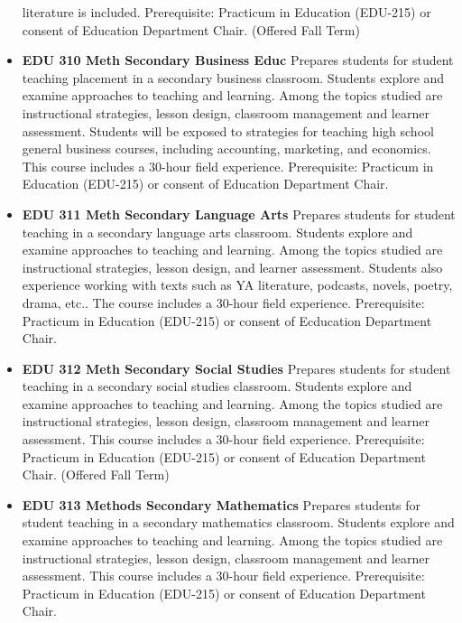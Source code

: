 \documentclass[
  letterpaper,
]{scrbook}
\begin{document}
\begin{itemize}
  literature is included. Prerequisite: Practicum in Education (EDU-215)
  or consent of Education Department Chair. (Offered Fall Term)\\
\item
  \textbf{EDU 310 Meth Secondary Business Educ} Prepares students for
  student teaching placement in a secondary business classroom. Students
  explore and examine approaches to teaching and learning. Among the
  topics studied are instructional strategies, lesson design, classroom
  management and learner assessment. Students will be exposed to
  strategies for teaching high school general business courses,
  including accounting, marketing, and economics. This course includes a
  30-hour field experience. Prerequisite: Practicum in Education
  (EDU-215) or consent of Education Department Chair.\\
\item
  \textbf{EDU 311 Meth Secondary Language Arts} Prepares students for
  student teaching in a secondary language arts classroom. Students
  explore and examine approaches to teaching and learning. Among the
  topics studied are instructional strategies, lesson design, and
  learner assessment. Students also experience working with texts such
  as YA literature, podcasts, novels, poetry, drama, etc.. The course
  includes a 30-hour field experience. Prerequisite: Practicum in
  Education (EDU-215) or consent of Ecducation Department Chair.\\
\item
  \textbf{EDU 312 Meth Secondary Social Studies} Prepares students for
  student teaching in a secondary social studies classroom. Students
  explore and examine approaches to teaching and learning. Among the
  topics studied are instructional strategies, lesson design, classroom
  management and learner assessment. This course includes a 30-hour
  field experience. Prerequisite: Practicum in Education (EDU-215) or
  consent of Education Department Chair. (Offered Fall Term)\\
\item
  \textbf{EDU 313 Methods Secondary Mathematics} Prepares students for
  student teaching in a secondary mathematics classroom. Students
  explore and examine approaches to teaching and learning. Among the
  topics studied are instructional strategies, lesson design, classroom
  management and learner assessment. This course includes a 30-hour
  field experience. Prerequisite: Practicum in Education (EDU-215) or
  consent of Education Department Chair.\\

\end{itemize}
\end{document}
